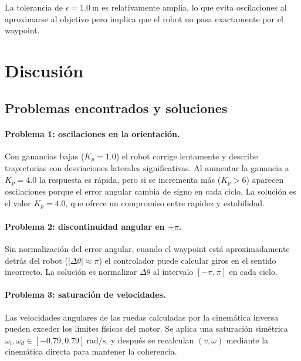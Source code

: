 \documentclass[12pt]{article}
\begin{document}
La tolerancia de $\epsilon = \SI{1.0}{\meter}$ es relativamente amplia, lo que evita oscilaciones al aproximarse al objetivo pero implica que el robot no pasa exactamente por el waypoint.


\section{Discusi\'{o}n}

\subsection{Problemas encontrados y soluciones}

\paragraph{Problema 1: oscilaciones en la orientaci\'{o}n.}
Con ganancias bajas ($K_p = 1.0$) el robot corrige lentamente y describe trayectorias con desviaciones laterales significativas. Al aumentar la ganancia a $K_p = 4.0$ la respuesta es r\'{a}pida, pero si se incrementa m\'{a}s ($K_p > 6$) aparecen oscilaciones porque el error angular cambia de signo en cada ciclo. La soluci\'{o}n es el valor $K_p = 4.0$, que ofrece un compromiso entre rapidez y estabilidad.

\paragraph{Problema 2: discontinuidad angular en $\pm\pi$.}
Sin normalizaci\'{o}n del error angular, cuando el waypoint est\'{a} aproximadamente detr\'{a}s del robot ($|\Delta\theta| \approx \pi$) el controlador puede calcular giros en el sentido incorrecto. La soluci\'{o}n es normalizar $\Delta\theta$ al intervalo $[-\pi, \pi]$ en cada ciclo.

\paragraph{Problema 3: saturaci\'{o}n de velocidades.}
Las velocidades angulares de las ruedas calculadas por la cinem\'{a}tica inversa pueden exceder los l\'{i}mites f\'{i}sicos del motor. Se aplica una saturaci\'{o}n sim\'{e}trica $\omega_i, \omega_d \in [-0.79, 0.79]~\si{\radian\per\second}$, y despu\'{e}s se recalculan $(v, \omega)$ mediante la cinem\'{a}tica directa para mantener la coherencia.
\end{document}

